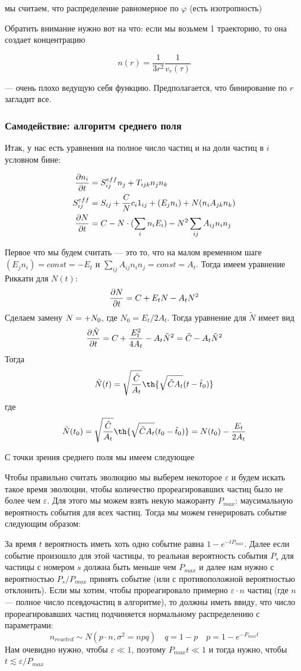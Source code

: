 мы считаем, что распределение равномерное по $\varphi$ (есть изотропность)

Обратить внимание нужно вот на что: если мы возьмем 1 траекторию, то она создает концентрацию

\[
	n(r) = \frac{1}{3r^2} \frac{1}{v_r(\tau)}
\]

--- очень плохо ведущую себя функцию. Предполагается, что бинирование по $r$ загладит все.

\subsubsection{Самодействие: алгоритм среднего поля}

Итак, у нас есть уравнения на полное число частиц и на доли частиц в $i$ условном бине:

\[
\begin{split}
	\frac{\partial n_i}{\partial t} &= S^{eff}_{ij} n_j + T_{ijk} n_j n_k \\
	S^{eff}_{ij} &= S_{ij} + \frac{C}{N} c_i 1_{ij} + (E_j n_i) + N(  n_i A_{jk} n_k )\\
	\frac{\partial N}{\partial t} &= C - N \cdot (\sum_{i} n_i E_i) - N^2 \sum_{ij} {A_{ij} n_i n_j}
\end{split}
\]

Первое что мы будем считать --- это то, что на малом временном шаге $(E_j n_i) = const = -E_t$ и $\sum_{ij} {A_{ij} n_i n_j} = const = A_t$. Тогда имеем уравнение Риккати для $N(t)$:
\[
\frac{\partial N}{\partial t} = C + E_t N - A_t N^2
\]
Сделаем замену $N = \title{N} + N_0$, где $N_0 = E_t/2A_t$. Тогда уравнение для $\tilde{N}$ имеет вид
\[
   \frac{\partial \tilde{N}}{\partial t} = C + \frac{E_t^2}{4A_t} - A_t \tilde{N}^2 = \tilde{C} - A_t \tilde{N}^2 
\]
Тогда
\[
	\tilde{N}(t) = \sqrt{\frac{\tilde{C}}{A_t }} \th{\sqrt{\tilde{C} A_t} (t-\tilde{t}_0)}
\]
где
\[
	\tilde{N}(t_0) = \sqrt{\frac{\tilde{C}}{A_t }} \th{\sqrt{\tilde{C} A_t} (t_0-\tilde{t}_0)} =
	N(t_0) - \frac{E_t}{2A_t}
\]


С точки зрения среднего поля мы имеем следующее

Чтобы правильно считать эволюцию мы выберем некоторое $\varepsilon$ и будем искать такое время эволюции, чтобы количество прореагировавших частиц было не более чем $\varepsilon$. Для этого мы можем взять некую мажоранту $P_{max}$: маусимальную вероятность события для всех частиц. Тогда мы можем генерировать событие следующим образом:

За время $t$ вероятность иметь хоть одно событие равна $1 - e^{-t P_{max}}$. Далее если событие произошло для этой частицы, то реальная вероятность события $P_s$ для частицы с номером $s$ должна быть меньше чем $P_{max}$ и далее нам нужно с вероятностью $P_s / P_{max}$ принять событие (или с противоположной вероятностью отклонить).
Если мы хотим, чтобы прореагировало примерно $\varepsilon \cdot n$ частиц (где $n$ --- полное число псевдочастиц в алгоритме), то должны иметь ввиду, что число прореагировавших частиц подчиняется нормальному распределению с параметрами:
\[
	n_{reacted} \sim N(p \cdot n, \sigma^2 = n p q) \quad q = 1 - p \quad p = 1 - e^{-P_{max} t}
\]
Нам очевидно нужно, чтобы $\varepsilon \ll 1$, поэтому $P_{max} t \ll 1$ и тогда нужно, чтобы $t \lesssim {\varepsilon}/{P_{max}}$

